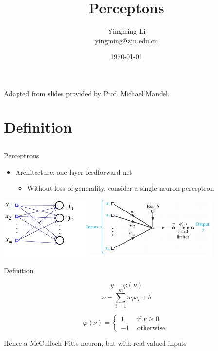 \documentclass[notes]{beamer}
\title[Opt for ML]{Perceptons}
\author[YingmingLi]{Yingming Li \\ yingming@zju.edu.cn}
\institute[DSERC, ZJU]{Data Science \& Engineering Research Center, ZJU}
\date[\today]{\today}
\providecommand{\tightlist}{%
  \setlength{\itemsep}{0pt}\setlength{\parskip}{0pt}}
\begin{document}



\begin{frame}
	\titlepage
	\begin{center}
		Adapted from slides provided by Prof.  Michael Mandel.		
	\end{center}

\end{frame}

\section{Definition}\label{definition}

\subsection{}\label{section}

\begin{frame}{Perceptrons}

\begin{itemize}
\tightlist
\item
  Architecture: one-layer feedforward net

  \begin{itemize}
  \tightlist
  \item
    Without loss of generality, consider a single-neuron perceptron
  \end{itemize}
\end{itemize}

\centering
\includegraphics[width=0.85000\textwidth]{2018-03-08-21-55-42.png}\\

\end{frame}

\begin{frame}{Definition}

\[y=\varphi(\nu)\] \[\nu=\sum_{i=1}^{m} w_i x_i +b \]

\[\varphi (\nu) = \left\{ \begin{array}{cc}
    1  & \text{ if } \nu \ge 0 \\ 
    -1 & \text{ otherwise } 
    \end{array} \right. \]

Hence a McCulloch-Pitts neuron, but with real-valued inputs

\end{frame}
\end{document}
